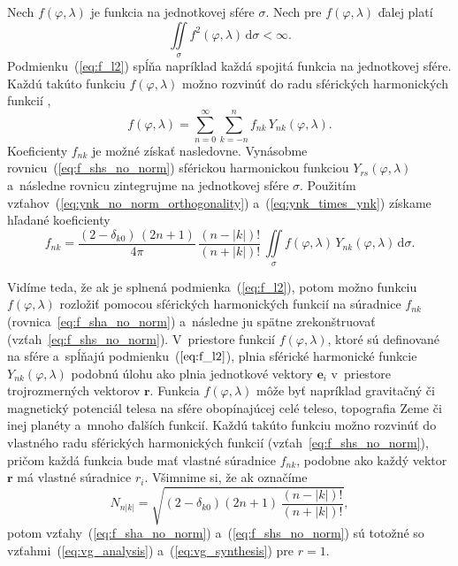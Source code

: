 \documentclass[a4paper, 12pt]{book}
\newcommand{\diff}{\mathrm d}
\let\vec\mathbf
\begin{document}
Nech $f(\varphi, \lambda)$ je funkcia na jednotkovej sfére $\sigma$.  Nech pre
$f(\varphi, \lambda)$ ďalej platí
%
\begin{equation}
\label{eq:f_l2}
\iint\limits_\sigma f^2(\varphi, \lambda) \, \diff \sigma < \infty{.}
\end{equation}
%
Podmienku~(\ref{eq:f_l2}) spĺňa napríklad každá spojitá funkcia na jednotkovej
sfére.  Každú takúto funkciu $f(\varphi, \lambda)$ možno rozvinúť do radu
sférických harmonických funkcií \parencite[napríklad][]{MoritzPhysicalGeodesy},
%
\begin{equation}
\label{eq:f_shs_no_norm}
f(\varphi, \lambda) = \sum_{n = 0}^\infty \sum_{k = -n}^n f_{nk} \,
Y_{nk}(\varphi, \lambda){.}
\end{equation}
%
Koeficienty $f_{nk}$ je možné získať nasledovne.  Vynásobme 
rovnicu~(\ref{eq:f_shs_no_norm}) sférickou harmonickou funkciou 
$Y_{rs}(\varphi, \lambda)$ a~následne rovnicu zintegrujme na jednotkovej sfére 
$\sigma$.  Použitím vzťahov~(\ref{eq:ynk_no_norm_orthogonality}) 
a~(\ref{eq:ynk_times_ynk}) získame hľadané koeficienty
%
\begin{equation}
\label{eq:f_sha_no_norm}
f_{nk} = \frac{(2 - \delta_{k0}) \, (2n + 1)}{4\pi} \, \frac{(n - |k|)!}{(n 
+ |k|)!} \, \iint\limits_{\sigma} f(\varphi, \lambda) \, Y_{nk}(\varphi, 
\lambda) \, \diff \sigma{.}
\end{equation}

Vidíme teda, že ak je splnená podmienka~(\ref{eq:f_l2}), potom možno 
funkciu~$f(\varphi, \lambda)$ rozložiť pomocou sférických harmonických funkcií 
na súradnice $f_{nk}$ (rovnica~\ref{eq:f_sha_no_norm}) a~následne ju spätne 
zrekonštruovať (vzťah~\ref{eq:f_shs_no_norm}).  V~priestore funkcií $f(\varphi, 
\lambda)$, ktoré sú definované na sfére a~spĺňajú podmienku~($\ref{eq:f_l2}$), 
plnia sférické harmonické funkcie $Y_{nk}(\varphi, \lambda)$ podobnú úlohu ako 
plnia jednotkové vektory $\vec e_i$ v~priestore trojrozmerných vektorov $\vec 
r$.  Funkcia $f(\varphi,\lambda)$ môže byť napríklad gravitačný či magnetický 
potenciál telesa na sfére obopínajúcej celé teleso, topografia Zeme či inej 
planéty a~mnoho ďalších funkcií.  Každú takúto funkciu možno rozvinúť do 
vlastného radu sférických harmonických funkcií (vzťah~\ref{eq:f_shs_no_norm}), 
pričom každá funkcia bude mať vlastné súradnice $f_{nk}$, podobne ako každý 
vektor $\vec r$ má vlastné súradnice $r_i$.  Všimnime si, že ak označíme
%
\begin{equation}
\label{eq:sh_norm}
N_{n|k|} = \sqrt{(2 - \delta_{k0}) (2n + 1) \, \frac{(n - |k|)!}{(n
+ |k|)!}}{,}
\end{equation}
%
potom vzťahy~(\ref{eq:f_sha_no_norm}) a~(\ref{eq:f_shs_no_norm}) sú totožné so
vzťahmi~(\ref{eq:vg_analysis}) a~(\ref{eq:vg_synthesis}) pre $r = 1$.
\end{document}
